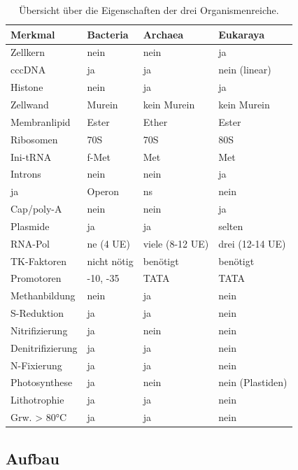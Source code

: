 \begin{table}[h!]
	\begin{center}
		\begin{tabular}{l l l l} 
			\toprule
			Merkmal		&	Bacteria		&	 Archaea				&	 Eukaraya		\\
			\midrule
			Zellkern 	&	nein			&	 nein					&	 ja		\\
			cccDNA		&	ja				&	 ja					&	 nein (linear)			\\
			Histone		&	nein			&	 ja					&	 ja		\\
			Zellwand		&	Murein		&	 kein Murein		&	 kein Murein		\\
			Membranlipid&	Ester			&	 Ether				&	 Ester		\\
			\midrule
			Ribosomen	&	70S			&	 70S					&	 80S		\\
			Ini-tRNA		&	f-Met			&	 Met					&	 Met		\\
			Introns 		&	nein			&	 nein					&	 ja		\\
			ja				&	Operon		&	 ns					&	 nein		\\
			Cap/poly-A 	&	nein			&	 nein					&	 ja		\\
			Plasmide		&	ja				&	 ja					&	 selten		\\
			RNA-Pol			&	ne (4 UE)	&	 viele (8-12 UE)	&	drei (12-14 UE)	\\
			TK-Faktoren		&	nicht nötig	&	 benötigt			&	benötigt		\\
			Promotoren		&	-10, -35		&	 TATA					&	TATA		\\
			\midrule
			Methanbildung		&	nein			&	 ja					&	nein		\\
			S-Reduktion		&	ja				&	 ja					&	nein		\\
			Nitrifizierung	&	ja				&	 nein					&	nein		\\
			Denitrifizierung		&	ja				&	 ja					&	nein		\\
			N-Fixierung		&	ja				&	 ja					&	nein		\\
			Photosynthese		&	ja				&	 nein					&	nein (Plastiden)	\\
			Lithotrophie	&	ja				&	 ja					&	nein		\\
			Grw. > 80°C		&	ja				&	 ja					&	nein		\\
			\bottomrule
		\end{tabular}
		\caption{Übersicht über die Eigenschaften der drei Organismenreiche.}
		\label{tab:domaenenuberblick}
	\end{center}
\end{table}

\subsection{Aufbau}

